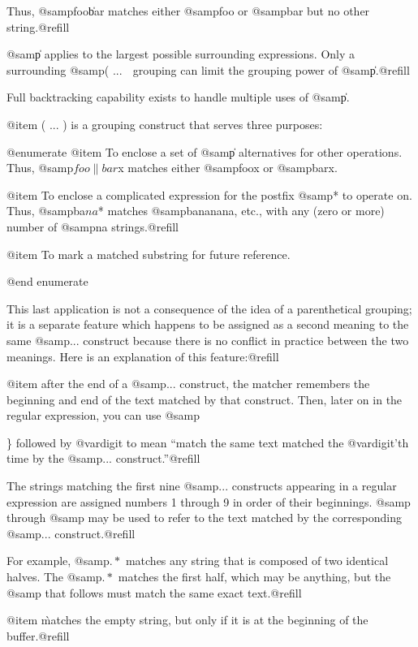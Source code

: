 {{{{{{{{{{{{{{{Thus, @samp{foo\|bar} matches either @samp{foo} or @samp{bar}
but no other string.@refill

@samp{\|} applies to the largest possible surrounding expressions.  Only a
surrounding @samp{\( ... \)} grouping can limit the grouping power of
@samp{\|}.@refill

Full backtracking capability exists to handle multiple uses of @samp{\|}.

@item \( ... \)
is a grouping construct that serves three purposes:

@enumerate
@item
To enclose a set of @samp{\|} alternatives for other operations.
Thus, @samp{\(foo\|bar\)x} matches either @samp{foox} or @samp{barx}.

@item
To enclose a complicated expression for the postfix @samp{*} to operate on.
Thus, @samp{ba\(na\)*} matches @samp{bananana}, etc., with any (zero or
more) number of @samp{na} strings.@refill

@item
To mark a matched substring for future reference.

@end enumerate

This last application is not a consequence of the idea of a parenthetical
grouping; it is a separate feature which happens to be assigned as a
second meaning to the same @samp{\( ... \)} construct because there is no
conflict in practice between the two meanings.  Here is an explanation
of this feature:@refill

@item 
after the end of a @samp{\( ... \)} construct, the matcher remembers the
beginning and end of the text matched by that construct.  Then, later on
in the regular expression, you can use @samp{\} followed by @var{digit}
to mean ``match the same text matched the @var{digit}'th time by the
@samp{\( ... \)} construct.''@refill

The strings matching the first nine @samp{\( ... \)} constructs appearing
in a regular expression are assigned numbers 1 through 9 in order of their
beginnings.
@samp{\1} through @samp{\9} may be used to refer to the text matched by
the corresponding @samp{\( ... \)} construct.@refill

For example, @samp{\(.*\)\1} matches any string that is composed of two
identical halves.  The @samp{\(.*\)} matches the first half, which may be
anything, but the @samp{\1} that follows must match the same exact text.@refill

@item \`
matches the empty string, but only if it is at the beginning
of the buffer.@refill

}}}}}}}}}}}}}}}}
